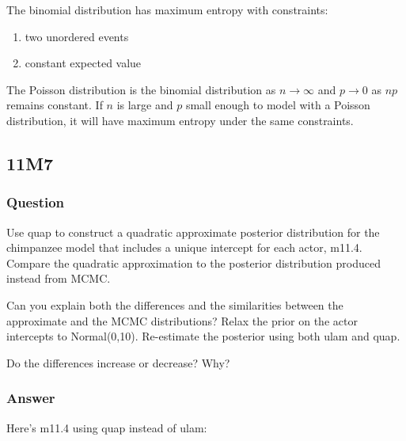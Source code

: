 \documentclass[
]{book}
\providecommand{\tightlist}{%
  \setlength{\itemsep}{0pt}\setlength{\parskip}{0pt}}
\begin{document}
The binomial distribution has maximum entropy with constraints:

\begin{enumerate}
\def\labelenumi{\arabic{enumi})}
\tightlist
\item
  two unordered events
\item
  constant expected value
\end{enumerate}

The Poisson distribution is the binomial distribution as \(n \to \infty\) and \(p \to 0\) as \(np\) remains constant. If \(n\) is large and \(p\) small enough to model with a Poisson distribution, it will have maximum entropy under the same constraints.

\hypertarget{m7-2}{%
\subsection*{11M7}\label{m7-2}}

\hypertarget{question-91}{%
\subsubsection*{Question}\label{question-91}}

Use quap to construct a quadratic approximate posterior distribution for the chimpanzee model that includes a unique intercept for each actor, m11.4. Compare the quadratic approximation to the posterior distribution produced instead from MCMC.

Can you explain both the differences and the similarities between the approximate and the MCMC distributions? Relax the prior on the actor intercepts to Normal(0,10). Re-estimate the posterior using both ulam and quap.

Do the differences increase or decrease? Why?

\hypertarget{answer-91}{%
\subsubsection*{Answer}\label{answer-91}}

Here's m11.4 using quap instead of ulam:
\end{document}
